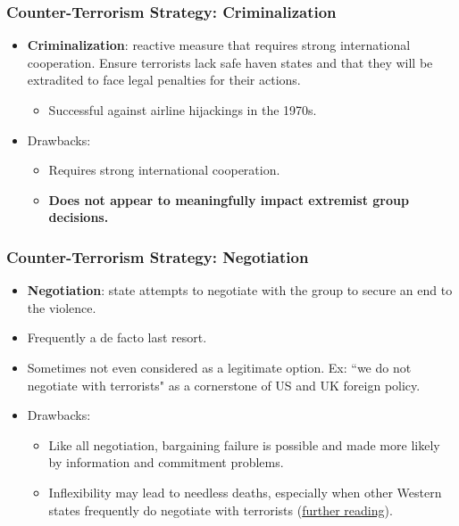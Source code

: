 \documentclass{beamer}
\begin{document}
\begin{frame} 
	\frametitle{\LARGE{Counter-Terrorism Strategy: Criminalization}}
	\begin{itemize}
		\item \textbf{Criminalization}: reactive measure that requires strong international cooperation. Ensure terrorists lack safe haven states and that they will be extradited to face legal penalties for their actions. \pause 
		\begin{itemize}
			\item Successful against airline hijackings in the 1970s. \pause
		\end{itemize}
		\item Drawbacks:
		\begin{itemize}
			\item Requires strong international cooperation. \pause
			\item \textbf{Does not appear to meaningfully impact extremist group decisions.} 
		\end{itemize}
	\end{itemize}
\end{frame}

\begin{frame} 
	\frametitle{\LARGE{Counter-Terrorism Strategy: Negotiation}}
	\begin{itemize}
		\item \textbf{Negotiation}: state attempts to negotiate with the group to secure an end to the violence.
		\item Frequently a de facto last resort. \pause
		\item Sometimes not even considered as a legitimate option. Ex: ``we do not negotiate with terrorists" as a cornerstone of US and UK foreign policy.
		\item Drawbacks:
		\begin{itemize}
			\item Like all negotiation, bargaining failure is possible and made more likely by information and commitment problems. \pause
			\item Inflexibility may lead to needless deaths, especially when other Western states frequently do negotiate with terrorists (\href{https://www.chathamhouse.org/2022/01/we-do-not-negotiate-terrorists-why}{further reading}).
		\end{itemize}
			
	\end{itemize}
\end{frame}
\end{document}
